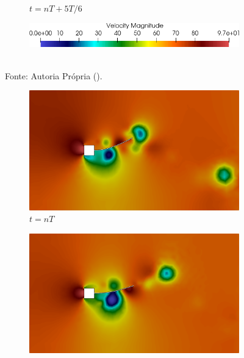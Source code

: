 \begin{figure}[h!]
\begin{subfigure}[b]{0.49\textwidth}
        \caption{$t=nT+5T/6$}
    \end{subfigure}
    \begin{subfigure}[b]{0.49\textwidth}
        \includegraphics[width=\linewidth]{Figuras/FSI-prism2/vLegenda.png}
    \end{subfigure}
    \\Fonte: Autoria Própria (\the\year).
    \label{fig:prismVel2}
\end{figure}

\begin{figure}[h!]
    \centering
    \caption{\textit{Flutter} em painel - Caso 2 - Campo de pressões obtidos no problema de \textit{Flutter} em painel.}
    \begin{subfigure}[b]{0.49\textwidth}
        \includegraphics[width=\linewidth]{Figuras/FSI-prism2/pT1.png}
        \caption{$t=nT$}
    \end{subfigure}
    \begin{subfigure}[b]{0.49\textwidth}
        \includegraphics[width=\linewidth]{Figuras/FSI-prism2/pT2.png}

\end{subfigure}
\end{figure}
